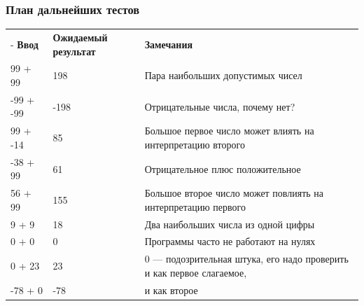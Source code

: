 \documentclass[xetex,mathserif,serif]{beamer}
\begin{document}
	\begin{frame}
		\frametitle{План дальнейших тестов}
		\begin{scriptsize}
			\begin{center}
				\begin{tabu} {| X[2 l p] | X[2 l p] | X[7 l p] |}
					\tabucline-
					\everyrow{\tabucline-}
					\textbf{Ввод}  & \textbf{Ожидаемый результат}  & \textbf{Замечания}                                                      \\
					99 + 99        & 198                           & Пара наибольших допустимых чисел                                        \\
					-99 + -99      & -198                          & Отрицательные числа, почему нет?                                        \\
					99 + -14       & 85                            & Большое первое число может влиять на интерпретацию второго              \\
					-38 + 99       & 61                            & Отрицательное плюс положительное                                        \\
					56 + 99        & 155                           & Большое второе число может повлиять на интерпретацию первого            \\
					9 + 9          & 18                            & Два наибольших числа из одной цифры                                     \\
					0 + 0          & 0                             & Программы часто не работают на нулях                                    \\
					0 + 23         & 23                            & 0 --- подозрительная штука, его надо проверить и как первое слагаемое,  \\
					-78 + 0        & -78                           & и как второе
				\end{tabu}
			\end{center}
		\end{scriptsize}
	\end{frame}
\end{document}
